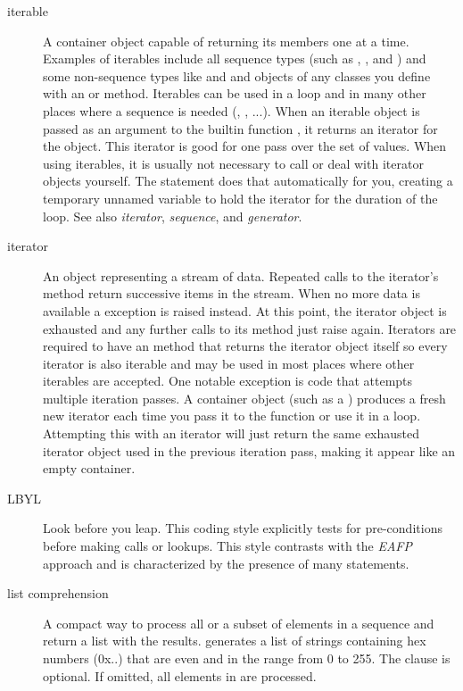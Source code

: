 \begin{description}
\item[iterable]
A container object capable of returning its members one at a time.
Examples of iterables include all sequence types (such as ,
{}, and ) and some non-sequence types like
{} and  and objects of any classes you define
with an  or  method.  Iterables
can be used in a  loop and in many other places where a
sequence is needed (, , ...).  When an
iterable object is passed as an argument to the builtin function
{}, it returns an iterator for the object.  This
iterator is good for one pass over the set of values.  When using
iterables, it is usually not necessary to call  or
deal with iterator objects yourself.  The  statement does
that automatically for you, creating a temporary unnamed variable to
hold the iterator for the duration of the loop.  See also
{}\emph{iterator}, \emph{sequence}, and \emph{generator}.

\item[iterator]
An object representing a stream of data.  Repeated calls to the
iterator's  method return successive items in the
stream.  When no more data is available a 
exception is raised instead.  At this point, the iterator object is
exhausted and any further calls to its  method just
raise  again.  Iterators are required to have
an  method that returns the iterator object
itself so every iterator is also iterable and may be used in most
places where other iterables are accepted.  One notable exception is
code that attempts multiple iteration passes.  A container object
(such as a ) produces a fresh new iterator each time you
pass it to the  function or use it in a
{} loop.  Attempting this with an iterator will just
return the same exhausted iterator object used in the previous iteration
pass, making it appear like an empty container.

\item[LBYL]
Look before you leap.  This coding style explicitly tests for
pre-conditions before making calls or lookups.  This style contrasts
with the \emph{EAFP} approach and is characterized by the presence of
many  statements.

\item[list comprehension]
A compact way to process all or a subset of elements in a sequence and
return a list with the results.   generates a list of strings
containing hex numbers (0x..) that are even and in the range from 0 to 255.
The  clause is optional.  If omitted, all elements in
{} are processed.


\end{description}

